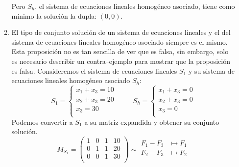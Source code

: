 \documentclass{article}
\begin{document}
\begin{enumerate}
\begin{enumerate}[label=\listAlph]
                Pero \(S_h\), el sistema de ecuaciones lineales homogéneo asociado, tiene como mínimo la solución la dupla: \(\left(0, 0\right)\).
			\item El tipo de conjunto solución de un sistema de ecuaciones lineales y el del sistema de ecuaciones lineales homogéneo asociado siempre es el mismo. \\
                Esta proposición no es tan sencilla de ver que es falsa, sin embargo, solo es necesario describir un contra--ejemplo para mostrar que la proposición es falsa.
                Consideremos el sistema de ecuaciones lineales \(S_1\) y su sistema de ecuaciones lineales homogéneo asociado \(S_h\):
                \[
                    S_1 = 
                    \left\{
                        \begin{aligned}
                            x_1 + x_3 = 10 \\
                            x_2 + x_3 = 20 \\
                            x_3 = 30 \\
                        \end{aligned}
                    \right.
                    \hspace{1cm}
                    S_h = 
                    \left\{
                        \begin{aligned}
                            x_1 + x_3 = 0 \\
                            x_2 + x_3 = 0 \\
                            x_3 = 0 \\
                        \end{aligned}
                    \right.
                \]
                Podemos convertir a \(S_1\) a su matriz expandida y obtener su conjunto solución.
                \[
                    M_{S_{1}} =
                    \left(
                    \begin{array}{ccc|c}
                        1 & 0 & 1 & 10 \\
                        0 & 1 & 1 & 20 \\
                        0 & 0 & 1 & 30 \\
                    \end{array}
                    \right)
                    \sim
                    \begin{aligned}
                        F_1 - F_3 &\mapsto F_1 \\
                        F_2 - F_3 &\mapsto F_2 \\

\end{aligned}\]
\end{enumerate}
\end{enumerate}
\end{document}
